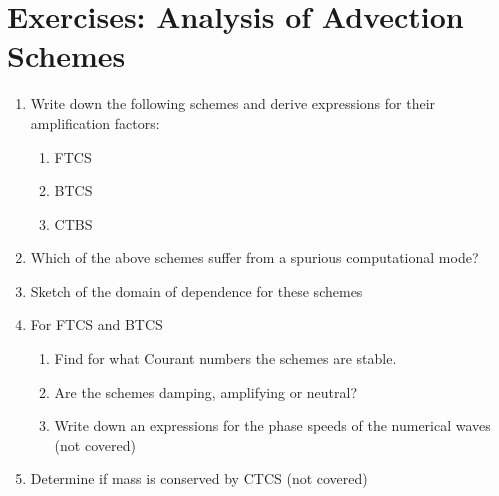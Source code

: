\section{Exercises: Analysis of Advection Schemes}
\begin{enumerate}
\item Write down the following schemes and derive expressions for their
amplification factors:

\begin{enumerate}
\item FTCS 
\item BTCS 
\item CTBS 
\end{enumerate}
\item Which of the above schemes suffer from a spurious computational mode?
\item Sketch of the domain of dependence for these schemes 
\item For FTCS and BTCS

\begin{enumerate}
\item Find for what Courant numbers the schemes are stable.
\item Are the schemes damping, amplifying or neutral?
\item Write down an expressions for the phase speeds of the numerical waves
(not covered)
\end{enumerate}
\item Determine if mass is conserved by CTCS (not covered)
\end{enumerate}
